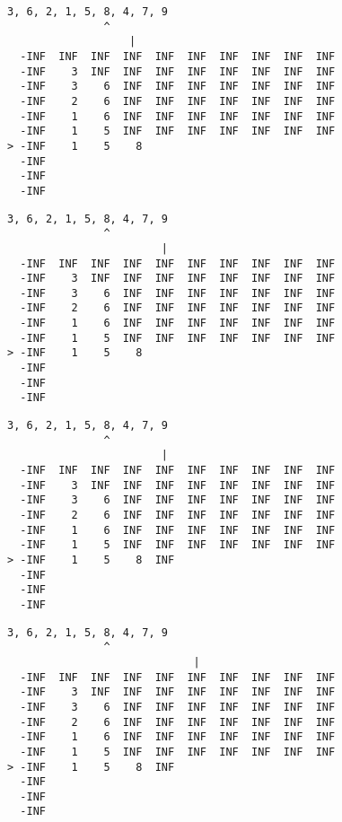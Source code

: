 { \begin{verbatim}
3, 6, 2, 1, 5, 8, 4, 7, 9
               ^
                   |
  -INF  INF  INF  INF  INF  INF  INF  INF  INF  INF
  -INF    3  INF  INF  INF  INF  INF  INF  INF  INF
  -INF    3    6  INF  INF  INF  INF  INF  INF  INF
  -INF    2    6  INF  INF  INF  INF  INF  INF  INF
  -INF    1    6  INF  INF  INF  INF  INF  INF  INF
  -INF    1    5  INF  INF  INF  INF  INF  INF  INF
> -INF    1    5    8                              
  -INF                                             
  -INF                                             
  -INF                                             
\end{verbatim} }

{ \begin{verbatim}
3, 6, 2, 1, 5, 8, 4, 7, 9
               ^
                        |
  -INF  INF  INF  INF  INF  INF  INF  INF  INF  INF
  -INF    3  INF  INF  INF  INF  INF  INF  INF  INF
  -INF    3    6  INF  INF  INF  INF  INF  INF  INF
  -INF    2    6  INF  INF  INF  INF  INF  INF  INF
  -INF    1    6  INF  INF  INF  INF  INF  INF  INF
  -INF    1    5  INF  INF  INF  INF  INF  INF  INF
> -INF    1    5    8                              
  -INF                                             
  -INF                                             
  -INF                                             
\end{verbatim} }

{ \begin{verbatim}
3, 6, 2, 1, 5, 8, 4, 7, 9
               ^
                        |
  -INF  INF  INF  INF  INF  INF  INF  INF  INF  INF
  -INF    3  INF  INF  INF  INF  INF  INF  INF  INF
  -INF    3    6  INF  INF  INF  INF  INF  INF  INF
  -INF    2    6  INF  INF  INF  INF  INF  INF  INF
  -INF    1    6  INF  INF  INF  INF  INF  INF  INF
  -INF    1    5  INF  INF  INF  INF  INF  INF  INF
> -INF    1    5    8  INF                         
  -INF                                             
  -INF                                             
  -INF                                             
\end{verbatim} }

{ \begin{verbatim}
3, 6, 2, 1, 5, 8, 4, 7, 9
               ^
                             |
  -INF  INF  INF  INF  INF  INF  INF  INF  INF  INF
  -INF    3  INF  INF  INF  INF  INF  INF  INF  INF
  -INF    3    6  INF  INF  INF  INF  INF  INF  INF
  -INF    2    6  INF  INF  INF  INF  INF  INF  INF
  -INF    1    6  INF  INF  INF  INF  INF  INF  INF
  -INF    1    5  INF  INF  INF  INF  INF  INF  INF
> -INF    1    5    8  INF                         
  -INF                                             
  -INF                                             
  -INF                                             
\end{verbatim} }

